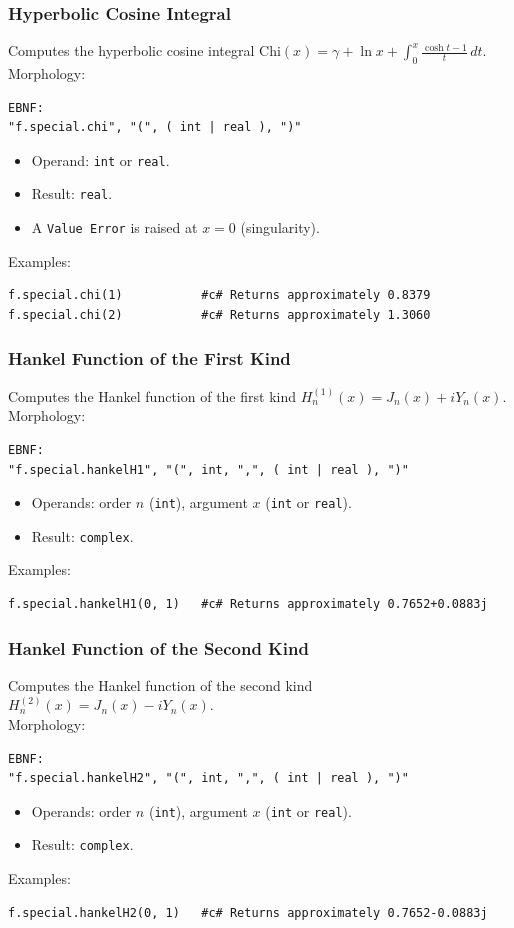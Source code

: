 \subsubsection{Hyperbolic Cosine Integral}
Computes the hyperbolic cosine integral $\text{Chi}(x) = \gamma + \ln x + \int_0^x \frac{\cosh t - 1}{t}\,dt$. \\
Morphology:
\begin{verbatim}
EBNF:
"f.special.chi", "(", ( int | real ), ")"
\end{verbatim}
\begin{itemize}
\item Operand: \texttt{int} or \texttt{real}.
\item Result: \texttt{real}.
\item A \texttt{Value Error} is raised at $x = 0$ (singularity).
\end{itemize}
Examples:
\begin{verbatim}
f.special.chi(1)           #c# Returns approximately 0.8379
f.special.chi(2)           #c# Returns approximately 1.3060
\end{verbatim}

\subsubsection{Hankel Function of the First Kind}
Computes the Hankel function of the first kind $H_n^{(1)}(x) = J_n(x) + i Y_n(x)$. \\
Morphology:
\begin{verbatim}
EBNF:
"f.special.hankelH1", "(", int, ",", ( int | real ), ")"
\end{verbatim}
\begin{itemize}
\item Operands: order $n$ (\texttt{int}), argument $x$ (\texttt{int} or \texttt{real}).
\item Result: \texttt{complex}.
\end{itemize}
Examples:
\begin{verbatim}
f.special.hankelH1(0, 1)   #c# Returns approximately 0.7652+0.0883j
\end{verbatim}

\subsubsection{Hankel Function of the Second Kind}
Computes the Hankel function of the second kind $H_n^{(2)}(x) = J_n(x) - i Y_n(x)$. \\
Morphology:
\begin{verbatim}
EBNF:
"f.special.hankelH2", "(", int, ",", ( int | real ), ")"
\end{verbatim}
\begin{itemize}
\item Operands: order $n$ (\texttt{int}), argument $x$ (\texttt{int} or \texttt{real}).
\item Result: \texttt{complex}.
\end{itemize}
Examples:
\begin{verbatim}
f.special.hankelH2(0, 1)   #c# Returns approximately 0.7652-0.0883j
\end{verbatim}

